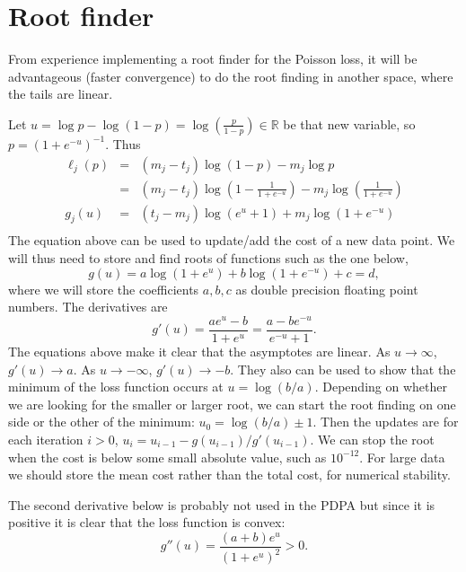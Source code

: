 \documentclass[12pt]{article}
\newcommand{\RR}{\mathbb R}
\begin{document}
\section{Root finder}

From experience implementing a root finder for the Poisson loss, it
will be advantageous (faster convergence) to do the root finding in
another space, where the tails are linear.

Let $u=\log p - \log(1-p) = \log(\frac{p}{1-p})\in\RR$ be that new
variable, so $p=(1+e^{-u})^{-1}$. Thus
\begin{eqnarray*}
  \ell_j(p) 
  &=& (m_j - t_j) \log(1-p) - m_j\log p \\
  &=& (m_j - t_j) \log(1-\frac{1}{1+e^{-u}}) - m_j\log(\frac{1}{1+e^{-u}})\\
g_j(u)  &=& (t_j - m_j) \log(e^u+1) + m_j\log(1+e^{-u}) \\
\end{eqnarray*}
The equation above can be used to update/add the cost of a new data
point. We will thus need to store and find roots of functions such as
the one below, 
\begin{equation}
  \label{eq:g(u)}
  g(u)=a\log(1+e^u)+b\log(1+e^{-u})+c=d,
\end{equation}
where we will store the coefficients $a,b,c$ as double
precision floating point numbers. The derivatives are
\begin{equation}
  \label{eq:g'(u)}
  g'(u)=\frac{ae^u - b}{1+e^u} = \frac{a-be^{-u}}{e^{-u}+1}.
\end{equation}
The equations above make it clear that the asymptotes are linear. As
$u\rightarrow\infty$, $g'(u)\rightarrow a$. As $u\rightarrow -\infty$,
$g'(u)\rightarrow -b$. They also can be used to show that the minimum
of the loss function occurs at $u=\log(b/a)$.  Depending on whether we
are looking for the smaller or larger root, we can start the root
finding on one side or the other of the minimum:
$u_0 = \log(b/a)\pm 1$. Then the updates are for each iteration $i>0$,
$u_i = u_{i-1} - g(u_{i-1})/g'(u_{i-1})$. We can stop the root when
the cost is below some small absolute value, such as $10^{-12}$. For
large data we should store the mean cost rather than the total cost,
for numerical stability.

The second derivative below is probably not used in
the PDPA but since it is positive it is clear that the loss function
is convex:
\begin{equation}
  \label{eq:g''(u)}
  g''(u)=\frac{(a+b)e^u}{(1+e^u)^2} > 0.
\end{equation}
\end{document}
